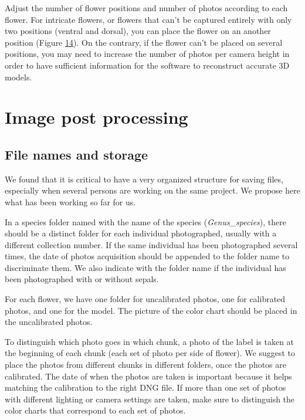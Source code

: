 \documentclass[
]{book}
\theoremstyle{definition}
\theoremstyle{definition}
\theoremstyle{definition}
\theoremstyle{definition}
\theoremstyle{remark}
\begin{document}
Adjust the number of flower positions and number of photos according to
each flower. For intricate flowers, or flowers that can't be captured
entirely with only two positions (ventral and dorsal), you can place the
flower on an another position (Figure
\protect\hyperlink{3placement}{14}). On the
contrary, if the flower can't be placed on several positions, you may
need to increase the number of photos per camera height in order to have
sufficient information for the software to reconstruct accurate 3D
models.

\hypertarget{image-post-processing}{%
\chapter{Image post processing}\label{image-post-processing}}

\hypertarget{file-names-and-storage}{%
\section{File names and storage}\label{file-names-and-storage}}

We found that it is critical to have a very organized structure for
saving files, especially when several persons are working on the same
project. We propose here what has been working so far for us.

In a species folder named with the name of the species
(\emph{Genus\_species}), there should be a distinct folder for each individual
photographed, usually with a different collection number. If the same
individual has been photographed several times, the date of photos
acquisition should be appended to the folder name to discriminate them.
We also indicate with the folder name if the individual has been
photographed with or without sepals.

For each flower, we have one folder for uncalibrated photos, one for
calibrated photos, and one for the model. The picture of the color chart
should be placed in the uncalibrated photos.

To distinguish which photo goes in which chunk, a photo of the label is
taken at the beginning of each chunk (each set of photo per side of
flower). We suggest to place the photos from different chunks in
different folders, once the photos are calibrated. The date of when the
photos are taken is important because it helps matching the calibration
to the right DNG file. If more than one set of photos with different
lighting or camera settings are taken, make sure to distinguish the
color charts that correspond to each set of photos.
\end{document}
